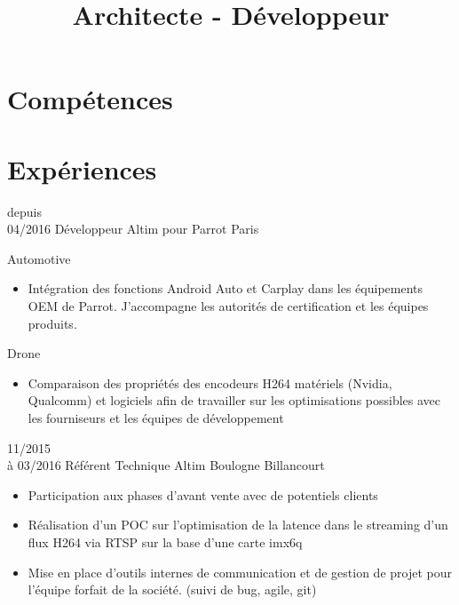 \documentclass[10pt,a4paper]{moderncv}       %
\title{Architecte - Développeur}
\begin{document}
\maketitle

\section{Compétences}

\section{Expériences}
\cventry
{depuis\\04/2016}   %
{Développeur}       %
{Altim pour Parrot} %
{Paris}             %
{}                  %
{
Automotive
\begin{itemize}
  \item Intégration des fonctions Android Auto et
  Carplay dans les équipements OEM de Parrot. J'accompagne les autorités de
  certification et les équipes produits.
\end{itemize}
Drone
\begin{itemize}
  \item Comparaison des propriétés des encodeurs H264 matériels (Nvidia,
  Qualcomm) et logiciels afin de travailler sur les optimisations possibles avec
  les fourniseurs et les équipes de développement
\end{itemize}
}
\cventry
{11/2015\\à 03/2016}   %
{Référent Technique}   %
{Altim}                %
{Boulogne Billancourt} %
{}                     %
{
\begin{itemize}
  \item Participation aux phases d'avant vente avec de potentiels clients
  \item Réalisation d'un POC sur l'optimisation de la latence dans le 
  streaming d'un flux H264 via RTSP sur la base d'une carte imx6q
  \item Mise en place d'outils internes de communication et de gestion de projet
  pour l'équipe forfait de la société. (suivi de bug, agile, git)
\end{itemize}
}
\end{document}
